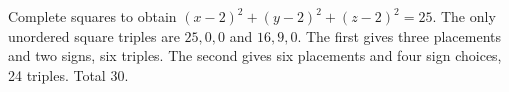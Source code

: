 Complete squares to obtain $(x-2)^2+(y-2)^2+(z-2)^2=25$. The only unordered square triples are $25,0,0$ and $16,9,0$. The first gives three placements and two signs, six triples. The second gives six placements and four sign choices, 24 triples. Total $\boxed{30}$.
